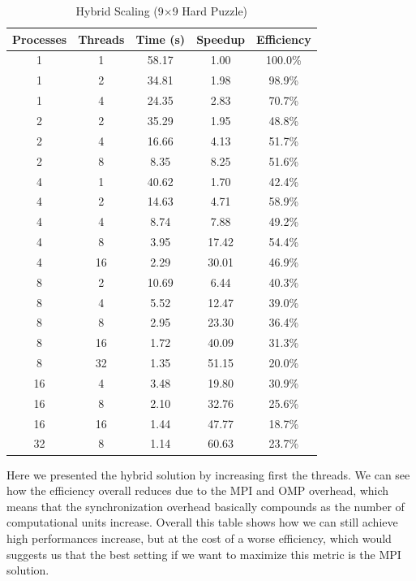 \begin{table}[htbp]
\caption{Hybrid Scaling (9×9 Hard Puzzle)}
\begin{center}
\begin{tabular}{@{}ccccc@{}}
\toprule
\textbf{Processes} & \textbf{Threads} & \textbf{Time (s)} & \textbf{Speedup} & \textbf{Efficiency} \\
\midrule
1  & 1  & 58.17 & 1.00  & 100.0\% \\
1  & 2  & 34.81 & 1.98  & 98.9\% \\
1  & 4  & 24.35 & 2.83  & 70.7\% \\
2  & 2  & 35.29 & 1.95  & 48.8\% \\
2  & 4  & 16.66 & 4.13  & 51.7\% \\
2  & 8  & 8.35  & 8.25  & 51.6\% \\
4  & 1  & 40.62 & 1.70  & 42.4\% \\
4  & 2  & 14.63 & 4.71  & 58.9\% \\
4  & 4  & 8.74  & 7.88  & 49.2\% \\
4  & 8  & 3.95  & 17.42 & 54.4\% \\
4  & 16 & 2.29  & 30.01 & 46.9\% \\
8  & 2  & 10.69 & 6.44  & 40.3\% \\
8  & 4  & 5.52  & 12.47 & 39.0\% \\
8  & 8  & 2.95  & 23.30 & 36.4\% \\
8  & 16 & 1.72  & 40.09 & 31.3\% \\
8  & 32 & 1.35  & 51.15 & 20.0\% \\
16 & 4  & 3.48  & 19.80 & 30.9\% \\
16 & 8  & 2.10  & 32.76 & 25.6\% \\
16 & 16 & 1.44  & 47.77 & 18.7\% \\
32 & 8  & 1.14  & 60.63 & 23.7\% \\
\bottomrule
\end{tabular}
\end{center}
\label{tab:hybrid_scaling}
\end{table}


Here we presented the hybrid solution by increasing first the threads. We can see how the efficiency overall reduces due to the MPI and OMP overhead, which means that the synchronization overhead basically compounds as the number of computational units increase. Overall this table shows how we can still achieve high performances increase, but at the cost of a worse efficiency, which would suggests us that the best setting if we want to maximize this metric is the MPI solution.

